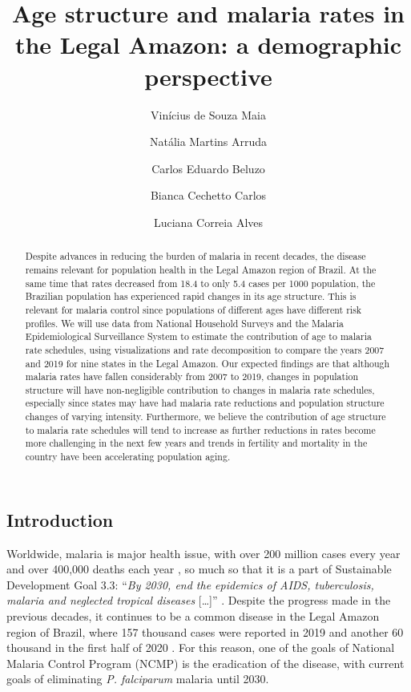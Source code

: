 \documentclass[
  12pt,
]{article}
\title{Age structure and malaria rates in the Legal Amazon: a demographic perspective}
\author{Vinícius de Souza Maia \and Natália Martins Arruda \and Carlos Eduardo Beluzo \and Bianca Cechetto Carlos \and Luciana Correia Alves}
\date{}
\begin{document}
\maketitle
\begin{abstract}
Despite advances in reducing the burden of malaria in recent decades, the disease remains relevant for population health in the Legal Amazon region of Brazil. At the same time that rates decreased from 18.4 to only 5.4 cases per 1000 population, the Brazilian population has experienced rapid changes in its age structure. This is relevant for malaria control since populations of different ages have different risk profiles. We will use data from National Household Surveys and the Malaria Epidemiological Surveillance System to estimate the contribution of age to malaria rate schedules, using visualizations and rate decomposition to compare the years 2007 and 2019 for nine states in the Legal Amazon. Our expected findings are that although malaria rates have fallen considerably from 2007 to 2019, changes in population structure will have non-negligible contribution to changes in malaria rate schedules, especially since states may have had malaria rate reductions and population structure changes of varying intensity. Furthermore, we believe the contribution of age structure to malaria rate schedules will tend to increase as further reductions in rates become more challenging in the next few years and trends in fertility and mortality in the country have been accelerating population aging.
\end{abstract}

\hypertarget{introduction}{%
\subsection{Introduction}\label{introduction}}

Worldwide, malaria is major health issue, with over 200 million cases every year and over 400,000 deaths each year \citep{WorldMalariaReport}, so much so that it is a part of Sustainable Development Goal 3.3: ``\emph{By 2030, end the epidemics of AIDS, tuberculosis, malaria and neglected tropical diseases} {[}\ldots{]}'' \citep{TransformingOurWorld} . Despite the progress made in the previous decades, it continues to be a common disease in the Legal Amazon region of Brazil, where 157 thousand cases were reported in 2019 and another 60 thousand in the first half of 2020 \citep{saudeBoletimEpidemiologicoMalaria2020}. For this reason, one of the goals of National Malaria Control Program (NCMP) is the eradication of the disease, with current goals of eliminating \emph{P. falciparum} malaria until 2030.
\end{document}
